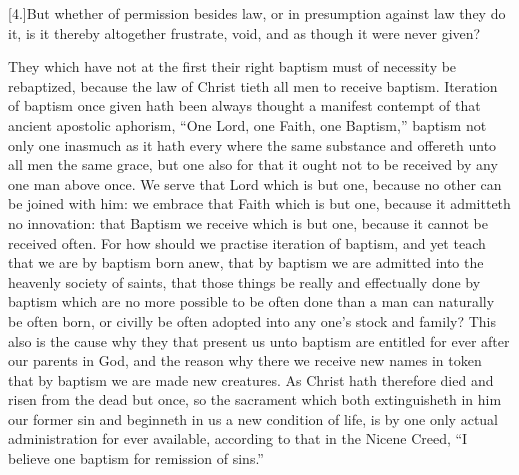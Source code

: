 [4.]But whether of permission besides law, or in presumption against law they do it, is it thereby altogether frustrate, void, and as though it were never given?

They which have not at the first their right baptism must of necessity be rebaptized, because the law of Christ tieth all men to receive baptism. Iteration of baptism once given hath been always thought a manifest contempt of that ancient apostolic aphorism, “One Lord, one Faith, one Baptism,” baptism not only one inasmuch as it hath every where the same substance and offereth unto all men the same grace, but one also for that it ought not to be received by any one man above once. We serve that Lord which is but one, because no other can be joined with him: we embrace that Faith which is but one, because it admitteth no innovation: that Baptism we receive which is but one, because it cannot be  received often.
 For how should we practise iteration of baptism, and yet teach that we are by baptism born anew, that by baptism we are admitted into the heavenly society of saints, that those things be really and effectually done by baptism which are no more possible to be often done than a man can naturally be often born, or civilly be often adopted into any one’s stock and family? This also is the cause why they that present us unto baptism are entitled for ever after our parents in God, and the reason why there we receive new names in token that by baptism we are made new creatures. As Christ hath therefore died and risen from the dead but once, so the sacrament which both extinguisheth in him our former sin and beginneth in us a new condition of life, is by one only actual administration for ever available, according to that in the Nicene Creed, “I believe one baptism for remission of sins.”


